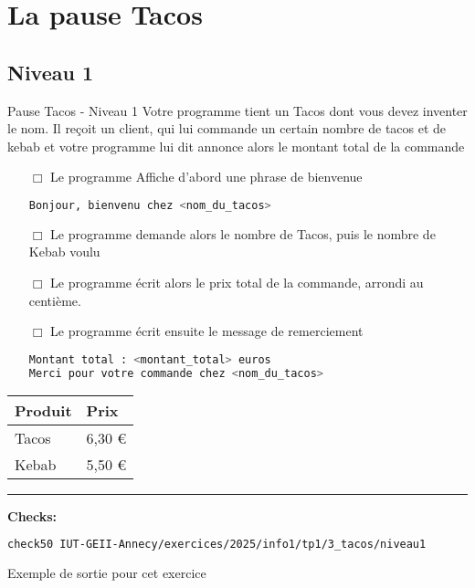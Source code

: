 
\section{La pause Tacos}
\subsection{Niveau 1}

\begin{UPSTIcahierDesCharges}{Pause Tacos - Niveau 1}
	Votre programme tient un Tacos dont vous devez inventer le nom.
	Il reçoit un client, qui lui commande un certain nombre de tacos et de kebab et votre programme lui dit annonce alors le montant total de la commande
	\begin{itemize}
		\item[$\Box$] Le programme Affiche d'abord une phrase de bienvenue
		      \begin{lstlisting}[language=bash,style=console]
Bonjour, bienvenu chez <nom_du_tacos>
\end{lstlisting}
		\item[$\Box$] Le programme demande alors le nombre de Tacos, puis le nombre de Kebab voulu
		\item[$\Box$] Le programme écrit alors le prix total de la commande, arrondi au centième.
		\item[$\Box$] Le programme écrit ensuite le message de remerciement
		      \begin{lstlisting}[language=bash,style=console]
Montant total : <montant_total> euros
Merci pour votre commande chez <nom_du_tacos>
\end{lstlisting}
	\end{itemize}
	\begin{center}
		\begin{tabular}{|l|l|}
			\hline
			Produit & Prix   \\
			\hline
			Tacos   & 6,30 € \\
			Kebab   & 5,50 € \\
			\hline
		\end{tabular}
	\end{center}
	\hrule
	\textbf{Checks:}
	\begin{lstlisting}[language=bash,style=console]
check50 IUT-GEII-Annecy/exercices/2025/info1/tp1/3_tacos/niveau1
\end{lstlisting}
\end{UPSTIcahierDesCharges}


\begin{UPSTIinfor}{Exemple de sortie pour cet exercice}
	
\end{UPSTIinfor}

